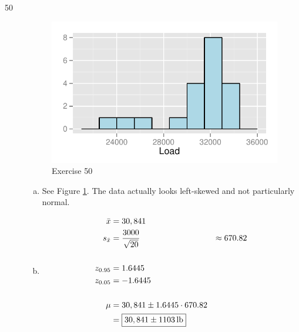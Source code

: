 \documentclass[letterpaper, landscape]{exam}
\begin{document}
\begin{description}
      \item[50]
        \begin{figure}[H]
          \centering
          \includegraphics{ex50.pdf}
          \caption{Exercise 50}
          \label{fig:ex50}
        \end{figure}

        \begin{enumerate}[(a)]
          \item See Figure \ref{fig:ex50}. The data actually looks left-skewed
            and not particularly normal.

          \item
            \begin{align*}
              \bar{x}     & = 30,841 \\
              s_{\bar{x}} & = \frac{3000}{\sqrt{20}}
                          & \approx 670.82 \\
              \\
              z_{0.95} & = 1.6445 \\
              z_{0.05} & = -1.6445 \\
              \\
              \mu & = 30,841 \pm 1.6445 \cdot 670.82 \\
                  & = \boxed{ \unit[30,841 \pm 1103]{lb} } \\
            \end{align*}
        \end{enumerate}


\end{description}
\end{document}
